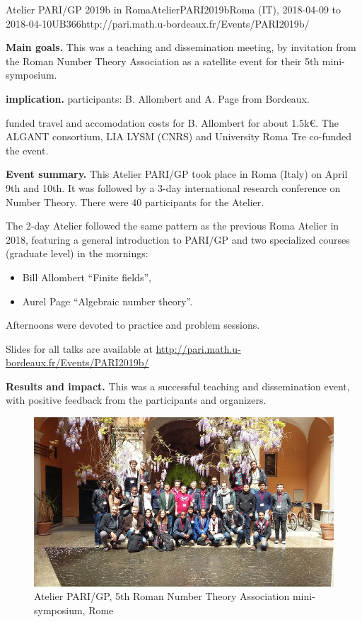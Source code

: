 \begin{event}{Atelier PARI/GP 2019b in Roma}{AtelierPARI2019b}{Roma (IT),
2018-04-09 to 2018-04-10}{UB}{36}{6}{http://pari.math.u-bordeaux.fr/Events/PARI2019b/}

\textbf{Main goals.} This was a teaching and dissemination meeting, by
invitation from the Roman Number Theory Association as a satellite
event for their 5th mini-symposium.

\textbf{\ODK implication.} \ODK participants: B. Allombert and A. Page from
Bordeaux.

\ODK funded travel and accomodation costs for B. Allombert for about
  1.5k\euro. The ALGANT consortium, LIA LYSM (CNRS) and University Roma Tre
  co-funded the event.

\textbf{Event summary.} This Atelier PARI/GP took place in Roma (Italy) on
April 9th and 10th.  It was followed by a 3-day international research
conference on Number Theory. There were 40 participants for the
Atelier.

The 2-day Atelier followed the same pattern as the previous Roma Atelier
in 2018,
featuring a general introduction to PARI/GP and two
  specialized courses (graduate level) in the mornings:
\begin{itemize}
\item Bill Allombert ``Finite fields'',
\item Aurel Page ``Algebraic number theory''.
\end{itemize}
Afternoons were devoted to practice and problem sessions.

Slides for all talks are available at
\url{http://pari.math.u-bordeaux.fr/Events/PARI2019b/}

\textbf{Results and impact.} This was a successful teaching and dissemination
event, with positive feedback from the participants and organizers.

\begin{figure}[ht]
  \includegraphics[width=.75\textwidth]{pari2019b.jpg}
  \caption*{Atelier PARI/GP, 5th Roman Number Theory Association mini-symposium, Rome}
\end{figure}
\end{event}
